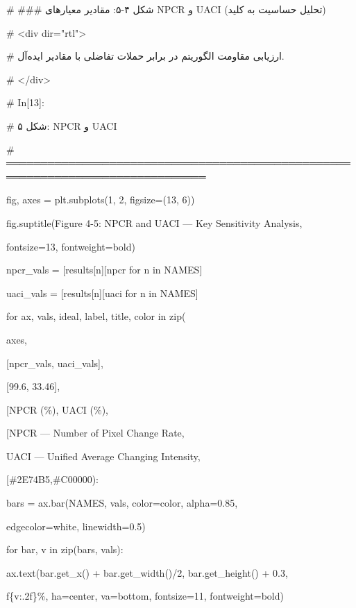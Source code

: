 \# \#\#\# شکل ۴-۵: مقادیر معیارهای NPCR و UACI (تحلیل حساسیت به کلید)

\# \textless div dir="rtl"\textgreater{}

\# ارزیابی مقاومت الگوریتم در برابر حملات تفاضلی با مقادیر ایده‌آل.

\# \textless/div\textgreater{}

\# In{[}13{]}:

\# شکل ۵: NPCR و UACI

\# ═══════════════════════════════════════════════════════════════════════════════

fig, axes = plt.subplots(1, 2, figsize=(13, 6))

fig.suptitle(\textquotesingle Figure 4-5: NPCR and UACI --- Key Sensitivity Analysis\textquotesingle,

fontsize=13, fontweight=\textquotesingle bold\textquotesingle)

npcr\_vals = {[}results{[}n{]}{[}\textquotesingle npcr\textquotesingle{]} for n in NAMES{]}

uaci\_vals = {[}results{[}n{]}{[}\textquotesingle uaci\textquotesingle{]} for n in NAMES{]}

for ax, vals, ideal, label, title, color in zip(

axes,

{[}npcr\_vals, uaci\_vals{]},

{[}99.6, 33.46{]},

{[}\textquotesingle NPCR (\%)\textquotesingle, \textquotesingle UACI (\%)\textquotesingle{]},

{[}\textquotesingle NPCR --- Number of Pixel Change Rate\textquotesingle,

\textquotesingle UACI --- Unified Average Changing Intensity\textquotesingle{]},

{[}\textquotesingle\#2E74B5\textquotesingle,\textquotesingle\#C00000\textquotesingle{]}):

bars = ax.bar(NAMES, vals, color=color, alpha=0.85,

edgecolor=\textquotesingle white\textquotesingle, linewidth=0.5)

for bar, v in zip(bars, vals):

ax.text(bar.get\_x() + bar.get\_width()/2, bar.get\_height() + 0.3,

f\textquotesingle\{v:.2f\}\%\textquotesingle, ha=\textquotesingle center\textquotesingle, va=\textquotesingle bottom\textquotesingle, fontsize=11, fontweight=\textquotesingle bold\textquotesingle)

